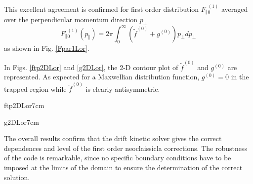 This excellent agreement is confirmed for first order distribution $F_{\Vert
}{}_{0}^{\left( 1\right) }$ averaged over the perpendicular momentum
direction $p_{\bot }$%
\begin{equation}
F_{\Vert }{}_{0}^{\left( 1\right) }\left( p_{\Vert }\right) =2\pi
\int_{0}^{\infty }\left( \widetilde{f}^{\left( 0\right) }+g^{\left( 0\right)
}\right) p_{\bot }dp_{\bot }  \label{Fpar1}
\end{equation}
as shown in Fig. \ref{Fpar1Lor}.


In Figs. \ref{ftp2DLor} and \ref{g2DLor}, the 2-D contour plot of $%
\widetilde{f}^{(0)}$ and $g^{\left( 0\right) }$ are represented. As expected
for a Maxwellian distribution function, $g^{\left( 0\right) }=0$ in the
trapped region while $\widetilde{f}^{(0)}$ is clearly antisymmetric.

{ftp2DLor}{7cm} %

{g2DLor}{7cm} %

The overall results confirm that the drift kinetic solver gives the correct
dependences and level of the first order neoclaissicla corrections. The
robustness of the code is remarkable, since no specific boundary conditions
have to be imposed at the limits of the domain to ensure the determination
of the correct solution.

